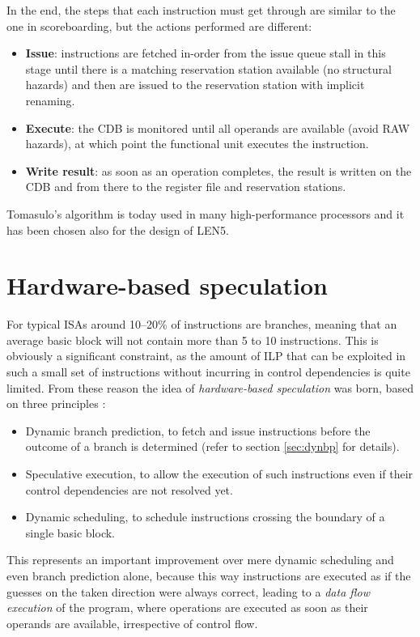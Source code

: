 In the end, the steps that each instruction must get through are similar to the one in scoreboarding, but the actions performed are different:
\begin{itemize}
  \item \textbf{Issue}: instructions are fetched in-order from the issue queue stall in this stage until there is a matching reservation station available (no structural hazards) and then are issued to the reservation station with implicit renaming.
  \item \textbf{Execute}: the \ac{CDB} is monitored until all operands are available (avoid \ac{RAW} hazards), at which point the functional unit executes the instruction.
  \item \textbf{Write result}: as soon as an operation completes, the result is written on the \ac{CDB} and from there to the register file and reservation stations.
\end{itemize}

Tomasulo's algorithm is today used in many high-performance processors and it has been chosen also for the design of LEN5.

\section{Hardware-based speculation}
For typical \acp{ISA} around 10--20\% of instructions are branches, meaning that an average basic block will not contain more than 5 to 10 instructions. This is obviously a significant constraint, as the amount of \ac{ILP} that can be exploited in such a small set of instructions without incurring in control dependencies is quite limited. From these reason the idea of \emph{hardware-based speculation} was born, based on three principles \cite[p.~208]{hennessy17}:
\begin{itemize}
  \item Dynamic branch prediction, to fetch and issue instructions before the outcome of a branch is determined (refer to section \ref{sec:dynbp} for details).
  \item Speculative execution, to allow the execution of such instructions even if their control dependencies are not resolved yet.
  \item Dynamic scheduling, to schedule instructions crossing the boundary of a single basic block.
\end{itemize}

This represents an important improvement over mere dynamic scheduling and even branch prediction alone, because this way instructions are executed as if the guesses on the taken direction were always correct, leading to a \emph{data flow execution} of the program, where operations are executed as soon as their operands are available, irrespective of control flow.

